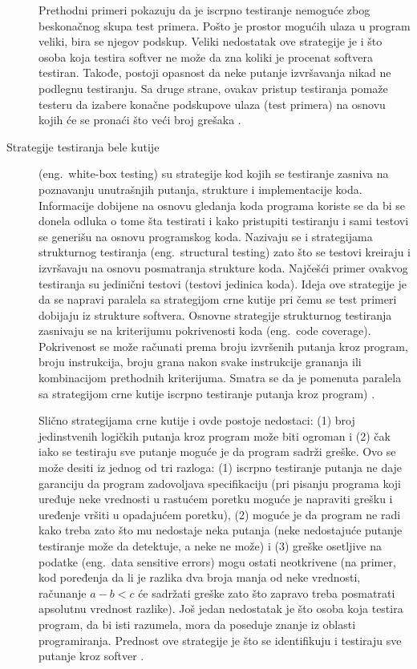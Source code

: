 \documentclass[12pt,oneside]{memoir}
\begin{document}
\begin{description}
Prethodni primeri pokazuju da je iscrpno testiranje nemoguće zbog beskonačnog skupa test primera. Pošto je prostor mogućih ulaza u program veliki, bira se njegov podskup. Veliki nedostatak ove strategije je i što osoba koja testira softver ne može da zna koliki je procenat softvera testiran. Takođe, postoji opasnost da neke putanje izvršavanja nikad ne podlegnu testiranju. Sa druge strane, ovakav pristup testiranja pomaže testeru da izabere konačne podskupove ulaza (test primera) na osnovu kojih će se pronaći što veći broj grešaka \cite{ArtOfST, PGtSTD}.

\item [Strategije testiranja bele kutije] (eng.~white-box testing) su strategije kod kojih se testiranje zasniva na poznavanju unutrašnjih putanja, strukture i implementacije koda. Informacije dobijene na osnovu gledanja koda programa koriste se da bi se donela odluka o tome šta testirati i kako pristupiti testiranju i sami testovi se generišu na osnovu programskog koda. Nazivaju se i strategijama strukturnog testiranja (eng.~structural testing) zato što se testovi kreiraju i izvršavaju na osnovu posmatranja strukture koda. Najčešći primer ovakvog testiranja su jedinični testovi (testovi jedinica koda). Ideja ove strategije je da se napravi paralela sa strategijom crne kutije pri čemu se test primeri dobijaju iz strukture softvera. Osnovne strategije strukturnog testiranja zasnivaju se na kriterijumu pokrivenosti koda (eng.~code coverage). Pokrivenost se može računati prema broju izvršenih putanja kroz program, broju instrukcija, broju grana nakon svake instrukcije grananja ili kombinacijom prethodnih kriterijuma. Smatra se da je pomenuta paralela sa strategijom crne kutije iscrpno testiranje putanja kroz program) \cite{PGtSTD, SoftTest, mvj, ArtOfST}. 

Slično strategijama crne kutije i ovde postoje nedostaci: (1) broj jedinstvenih logičkih putanja kroz program može biti ogroman i (2) čak iako se testiraju sve putanje moguće je da program sadrži greške. Ovo se može desiti iz jednog od tri razloga: (1) iscrpno testiranje putanja ne daje garanciju da program zadovoljava specifikaciju (pri pisanju programa koji uređuje neke vrednosti u rastućem poretku moguće je napraviti grešku i uređenje vršiti u opadajućem poretku), (2) moguće je da program ne radi kako treba zato što mu nedostaje neka putanja (neke nedostajuće putanje testiranje može da detektuje, a neke ne može) i (3) greške osetljive na podatke (eng.~data sensitive errors) mogu ostati neotkrivene (na primer, kod poređenja da li je razlika dva broja manja od neke vrednosti, računanje $a-b<c$ će sadržati greške zato što zapravo treba posmatrati apsolutnu vrednost razlike). Još jedan nedostatak je što osoba koja testira program, da bi isti razumela, mora da poseduje znanje iz oblasti programiranja. Prednost ove strategije je što se identifikuju i testiraju sve putanje kroz softver \cite{mvj, ArtOfST, PGtSTD}.


\end{description}
\end{document}
